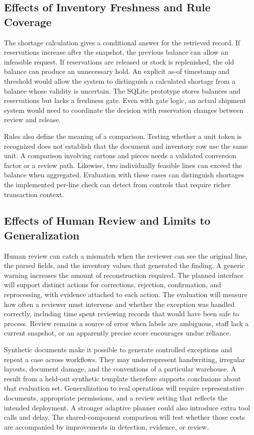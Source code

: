 \documentclass[conference]{IEEEtran}
\begin{document}
\subsection{Effects of Inventory Freshness and Rule Coverage}
The shortage calculation gives a conditional answer for the retrieved record. If reservations increase after the snapshot, the previous balance can allow an infeasible request. If reservations are released or stock is replenished, the old balance can produce an unnecessary hold. An explicit as-of timestamp and threshold would allow the system to distinguish a calculated shortage from a balance whose validity is uncertain. The SQLite prototype stores balances and reservations but lacks a freshness gate. Even with gate logic, an actual shipment system would need to coordinate the decision with reservation changes between review and release.

Rules also define the meaning of a comparison. Testing whether a unit token is recognized does not establish that the document and inventory row use the same unit. A comparison involving cartons and pieces needs a validated conversion factor or a review path. Likewise, two individually feasible lines can exceed the balance when aggregated. Evaluation with these cases can distinguish shortages the implemented per-line check can detect from controls that require richer transaction context.

\subsection{Effects of Human Review and Limits to Generalization}
Human review can catch a mismatch when the reviewer can see the original line, the parsed fields, and the inventory values that generated the finding. A generic warning increases the amount of reconstruction required. The planned interface will support distinct actions for corrections, rejection, confirmation, and reprocessing, with evidence attached to each action. The evaluation will measure how often a reviewer must intervene and whether the exception was handled correctly, including time spent reviewing records that would have been safe to process. Review remains a source of error when labels are ambiguous, staff lack a current snapshot, or an apparently precise score encourages undue reliance.

Synthetic documents make it possible to generate controlled exceptions and repeat a case across workflows. They may underrepresent handwriting, irregular layouts, document damage, and the conventions of a particular warehouse. A result from a held-out synthetic template therefore supports conclusions about that evaluation set. Generalization to real operations will require representative documents, appropriate permissions, and a review setting that reflects the intended deployment. A stronger adaptive planner could also introduce extra tool calls and delay. The shared-component comparison will test whether those costs are accompanied by improvements in detection, evidence, or review.
\end{document}
